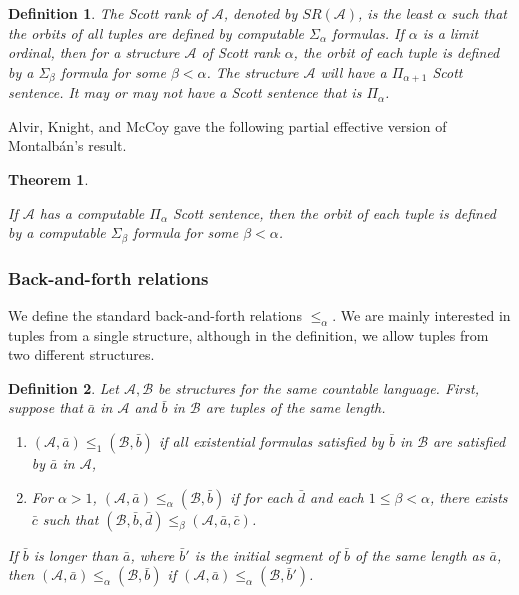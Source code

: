 \documentclass{article}
\newtheorem{thm}{Theorem}[section]
\newtheorem{defn}{Definition}
\begin{document}
\begin{defn}

The \emph{Scott rank} of $\mathcal{A}$, denoted by $SR(\mathcal{A})$, is the least $\alpha$ such that the orbits of all tuples are defined by computable $\Sigma_\alpha$ formulas.  If $\alpha$ is a limit ordinal, then for a structure $\mathcal{A}$ of Scott rank $\alpha$, the orbit of each tuple is defined by a $\Sigma_\beta$ formula for some $\beta < \alpha$.  The structure $\mathcal{A}$ will have a $\Pi_{\alpha+1}$ Scott sentence.  It may or may not have a Scott sentence that is $\Pi_\alpha$.   

\end{defn}

Alvir, Knight, and McCoy \cite{AKM} gave the following partial effective version of Montalb\'{a}n's result.

\begin{thm}\label{thm:AKM}

If $\mathcal{A}$ has a computable $\Pi_\alpha$ Scott sentence, then the orbit of each tuple is defined by a computable $\Sigma_\beta$ formula for some $\beta < \alpha$.    

\end{thm}

\subsubsection{Back-and-forth relations}

We define the standard back-and-forth relations  $\leq_\alpha$.  We are mainly interested in tuples from a single structure, although in the definition, we allow tuples from two different structures.       

\begin{defn}

Let $\mathcal{A},\mathcal{B}$ be structures for the same countable language.  First, suppose that $\bar{a}$ in $\mathcal{A}$ and $\bar{b}$ in $\mathcal{B}$ are tuples of the same length.  

\begin{enumerate}

\item  $(\mathcal{A},\bar{a})\leq_1(\mathcal{B},\bar{b})$ if all existential formulas satisfied by $\bar{b}$ in $\mathcal{B}$ are satisfied by $\bar{a}$ in $\mathcal{A}$,

\item  For $\alpha > 1$, $(\mathcal{A},\bar{a})\leq_\alpha (\mathcal{B},\bar{b})$ if for each $\bar{d}$ and each $1\leq\beta < \alpha$, there exists $\bar{c}$ such that $(\mathcal{B},\bar{b},\bar{d})\leq_\beta(\mathcal{A},\bar{a},\bar{c})$.  

\end{enumerate}  

If $\bar{b}$ is longer than $\bar{a}$, where $\bar{b}'$ is the initial segment of $\bar{b}$ of the same length as $\bar{a}$, then $(\mathcal{A},\bar{a})\leq_\alpha(\mathcal{B},\bar{b})$ if $(\mathcal{A},\bar{a})\leq_\alpha(\mathcal{B},\bar{b}')$.   

\end{defn}
\end{document}
